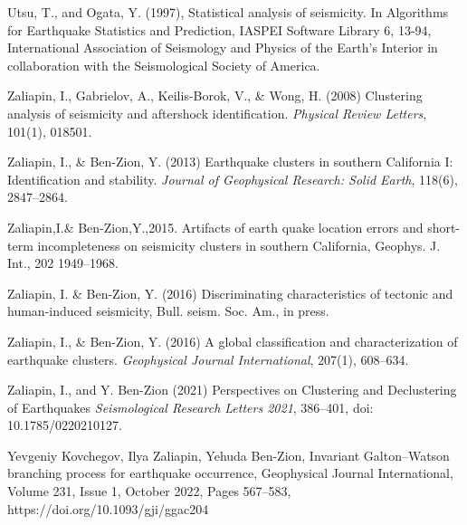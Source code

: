 \documentclass[12pt]{article} %
\theoremstyle{plain}
\begin{document}
\begin{thebibliography}{99}
		Utsu, T., and Ogata, Y. (1997), Statistical analysis of seismicity. In Algorithms for Earthquake Statistics and Prediction, IASPEI Software Library 6, 13-94, International Association of Seismology and Physics of the Earth’s Interior in collaboration with the Seismological Society of America.
		
		Zaliapin, I., Gabrielov, A., Keilis-Borok, V., \& Wong, H. (2008) 
		Clustering analysis of seismicity and aftershock identification. 
		{\em Physical Review Letters}, 101(1), 018501.
		
		Zaliapin, I., \& Ben-Zion, Y. (2013) 
		Earthquake clusters in southern California I: Identification and stability. 
		{\em Journal of Geophysical Research: Solid Earth}, 118(6), 2847--2864.

		Zaliapin,I.\& Ben-Zion,Y.,2015.
		Artifacts of earth quake location errors and short-term incompleteness on seismicity clusters in southern California,
		Geophys. J. Int., 202 1949–1968.
		
		Zaliapin, I. \& Ben-Zion, Y. (2016) 
		Discriminating characteristics of tectonic
		and human-induced seismicity, Bull. seism. Soc. Am., in press.
		
		Zaliapin, I., \& Ben-Zion, Y. (2016)
		A global classification and characterization of earthquake clusters. 
		{\em Geophysical Journal International}, 207(1), 608--634.
	
		
		Zaliapin, I., and Y. Ben-Zion (2021)
		Perspectives on Clustering and Declustering of Earthquakes 
		{\em Seismological Research Letters 2021}, 386–401, doi: 10.1785/0220210127.

		Yevgeniy Kovchegov, Ilya Zaliapin, Yehuda Ben-Zion, Invariant Galton–Watson branching process for earthquake occurrence, Geophysical Journal International, Volume 231, Issue 1, October 2022, Pages 567–583, https://doi.org/10.1093/gji/ggac204
		
	
	\end{thebibliography}
	
	
	
\end{document}
